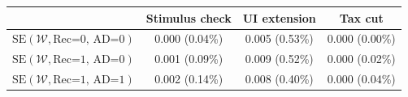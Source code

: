 \begin{tabular}{@{}lccc@{}}
\toprule
                          & Stimulus check      & UI extension    & Tax cut    \\  \midrule
$\mathrm{SE}(\mathcal{W}, \text{Rec=0, AD=0})$ & 0.000 (0.04\%)  & 0.005 (0.53\%)  & 0.000 (0.00\%)     \\
$\mathrm{SE}(\mathcal{W}, \text{Rec=1, AD=0})$ & 0.001 (0.09\%)  & 0.009 (0.52\%)  & 0.000 (0.02\%)     \\
$\mathrm{SE}(\mathcal{W}, \text{Rec=1, AD=1})$ & 0.002 (0.14\%)  & 0.008 (0.40\%)  & 0.000 (0.04\%)     \\ \bottomrule
\end{tabular}
